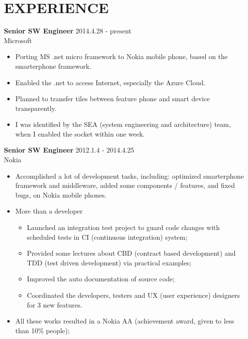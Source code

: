 
\section{EXPERIENCE}
\textbf{Senior SW Engineer} \hfill 2014.4.28 - present\\
        Microsoft
        \begin{itemize}  \itemsep -2pt %
                \item Porting MS .net micro framework to Nokia mobile phone, based on the smarterphone framework.
                \item Enabled the .net to access Internet, especially the Azure Cloud.
                \item Planned to transfer tiles between feature phone and smart device transparently.
                \item I was identified by the SEA (system engineering and architecture) team, when I enabled the socket within one week.
        \end{itemize}

\textbf{Senior SW Engineer} \hfill 2012.1.4 - 2014.4.25\\
        Nokia
        \begin{itemize}  \itemsep -2pt %
        \item Accomplished a lot of development tasks, including:
            optimized smarterphone framework and middleware, added some components / features, and fixed bugs,
        on Nokia mobile phones.
        \item More than a developer 
            \begin{itemize}  \itemsep -2pt
                \item Launched an integration test project to guard code changes
                with scheduled tests in CI (continuous integration) system;
                \item Provided some lectures about CBD (contract based development) and
                TDD (test driven development) via practical examples;
                \item Improved the auto documentation of source code;
                \item Coordinated the developers, testers and UX (user experience) designers for 3 new features.
            \end{itemize}
        \item All these works resulted in a Nokia AA (achievement award, given to less than 10\% people);
        \end{itemize}


